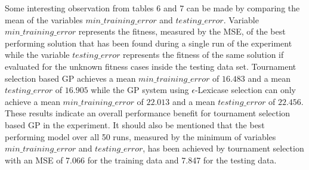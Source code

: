 \documentclass[
  12pt,
]{article}
\begin{document}
\begin{table}[!h]

\caption{\label{tab:unnamed-chunk-7}Summary - Epsilon-Lexicase Selection}
\centering
{}
\end{table}

Some interesting observation from tables 6 and 7 can be made by
comparing the mean of the variables \(min\_training\_error\) and
\(testing\_error\). Variable \(min\_training\_error\) represents the
fitness, measured by the MSE, of the best performing solution that has
been found during a single run of the experiment while the variable
\(testing\_error\) represents the fitness of the same solution if
evaluated for the unknown fitness cases inside the testing data set.
Tournament selection based GP achieves a mean \(min\_training\_error\)
of \(16.483\) and a mean \(testing\_error\) of \(16.905\) while the GP
system using \(\epsilon\)-Lexicase selection can only achieve a mean
\(min\_training\_error\) of \(22.013\) and a mean \(testing\_error\) of
\(22.456\). These results indicate an overall performance benefit for
tournament selection based GP in the experiment. It should also be
mentioned that the best performing model over all 50 runs, measured by
the minimum of variables \(min\_training\_error\) and
\(testing\_error\), has been achieved by tournament selection with an
MSE of 7.066 for the training data and 7.847 for the testing data.
\end{document}
